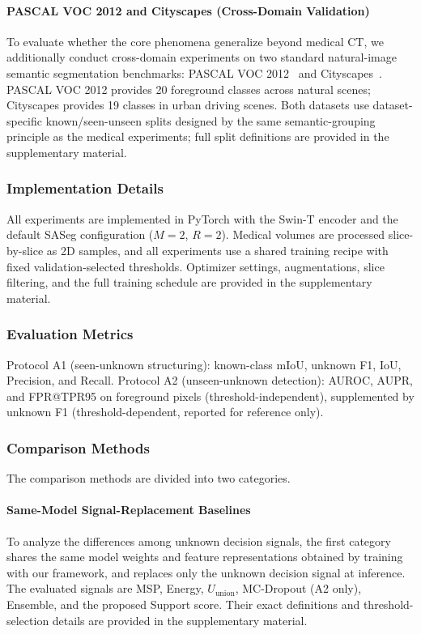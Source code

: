 \documentclass[journal]{IEEEtai}
\begin{document}
\paragraph{PASCAL VOC 2012 and Cityscapes (Cross-Domain Validation)}
To evaluate whether the core phenomena generalize beyond medical CT, we additionally
conduct cross-domain experiments on two standard natural-image semantic segmentation
benchmarks: PASCAL VOC 2012~\cite{everingham2010pascal} and
Cityscapes~\cite{cordts2016cityscapes}.
PASCAL VOC 2012 provides 20 foreground classes across natural scenes;
Cityscapes provides 19 classes in urban driving scenes.
Both datasets use dataset-specific known/seen-unseen splits designed by the same
semantic-grouping principle as the medical experiments; full split definitions are
provided in the supplementary material.

\subsubsection{Implementation Details}\label{sec:exp:setup:impl}

All experiments are implemented in PyTorch with the Swin-T encoder and the default
SASeg configuration ($M{=}2$, $R{=}2$).
Medical volumes are processed slice-by-slice as 2D samples, and all experiments use a
shared training recipe with fixed validation-selected thresholds.
Optimizer settings, augmentations, slice filtering, and the full training schedule are
provided in the supplementary material.

\subsubsection{Evaluation Metrics}\label{sec:exp:setup:metric}

Protocol A1 (seen-unknown structuring):
known-class mIoU, unknown F1, IoU, Precision, and Recall.
Protocol A2 (unseen-unknown detection):
AUROC, AUPR, and FPR@TPR95 on foreground pixels (threshold-independent),
supplemented by unknown F1 (threshold-dependent, reported for reference only).

\subsubsection{Comparison Methods}\label{sec:exp:setup:baseline}

The comparison methods are divided into two categories.

\paragraph{Same-Model Signal-Replacement Baselines}
To analyze the differences among unknown decision signals, the first category shares the
same model weights and feature representations obtained by training with our framework,
and replaces only the unknown decision signal at inference.
The evaluated signals are MSP, Energy, $U_{\text{union}}$, MC-Dropout (A2 only),
Ensemble, and the proposed Support score.
Their exact definitions and threshold-selection details are provided in the
supplementary material.
\end{document}
